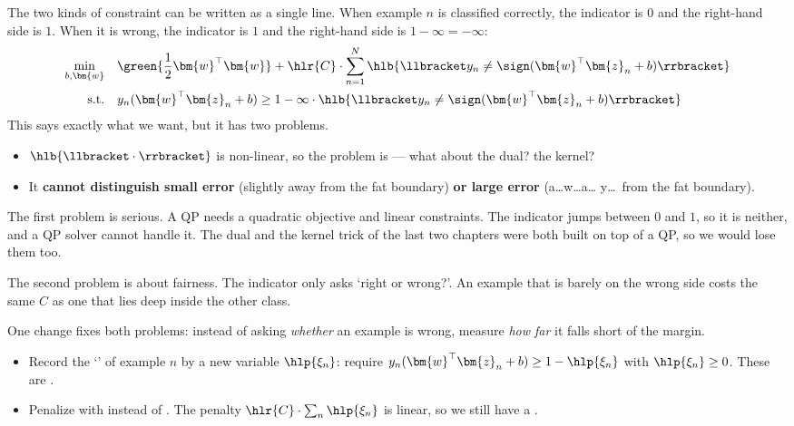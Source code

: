 The two kinds of constraint can be written as a single line. When example
\(n\) is classified correctly, the indicator is \(0\) and the right-hand side
is \(1\). When it is wrong, the indicator is \(1\) and the right-hand side
is \(1 - \infty = -\infty\):
\[
    \begin{aligned}
        \min_{b, \bm{w}} \quad & \green{\frac{1}{2} \bm{w}^\top \bm{w}} +
            \hlr{C} \cdot \sum_{n=1}^N \hlb{\llbracket y_n \neq
            \sign(\bm{w}^\top \bm{z}_n + b) \rrbracket}\\
        \text{s.t.} \quad & y_n (\bm{w}^\top \bm{z}_n + b) \ge 1 - \infty
            \cdot \hlb{\llbracket y_n \neq \sign(\bm{w}^\top \bm{z}_n + b)
            \rrbracket}
    \end{aligned}
\]
This says exactly what we want, but it has two problems.
\begin{itemize}
    \item \(\hlb{\llbracket \cdot \rrbracket}\) is non-linear, so the
        problem is  --- what about the dual?
        the kernel?
    \item It \textbf{cannot distinguish small error} (slightly away from the
        fat boundary) \textbf{or large error} (a\ldots w\ldots a\ldots
        y\ldots\ from the fat boundary).
\end{itemize}

The first problem is serious. A QP needs a quadratic objective and linear
constraints. The indicator jumps between \(0\) and \(1\), so it is neither,
and a QP solver cannot handle it. The dual and the kernel trick of the last
two chapters were both built on top of a QP, so we would lose them too.

The second problem is about fairness. The indicator only asks `right or
wrong?'. An example that is barely on the wrong side costs the same \(C\) as
one that lies deep inside the other class.

One change fixes both problems: instead of asking \emph{whether} an example
is wrong, measure \emph{how far} it falls short of the margin.
\begin{itemize}
    \item Record the `' of example \(n\) by a new
        variable \(\hlp{\xi_n}\): require \(y_n (\bm{w}^\top \bm{z}_n + b)
        \ge 1 - \hlp{\xi_n}\) with \(\hlp{\xi_n} \ge 0\). These are
        .
    \item Penalize with  instead of
        . The penalty \(\hlr{C} \cdot \sum_n
        \hlp{\xi_n}\) is linear, so we still have a .
\end{itemize}

